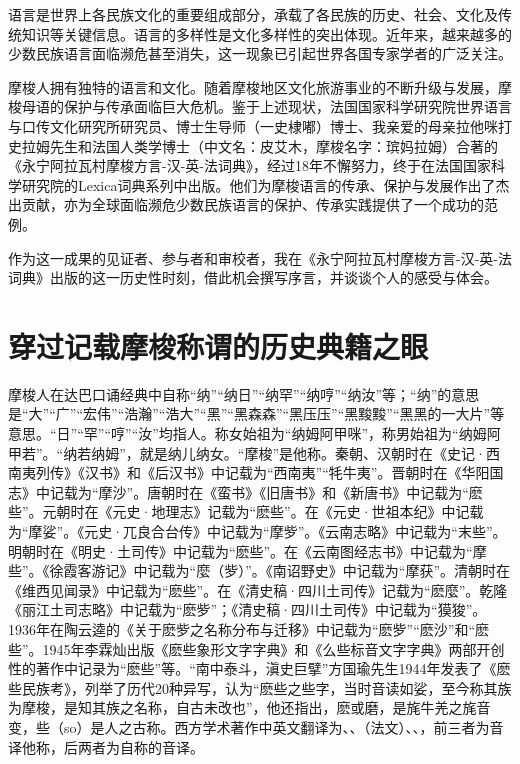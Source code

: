 语言是世界上各民族文化的重要组成部分，承载了各民族的历史、社会、文化及传统知识等关键信息。语言的多样性是文化多样性的突出体现。近年来，越来越多的少数民族语言面临濒危甚至消失，这一现象已引起世界各国专家学者的广泛关注。

摩梭人拥有独特的语言和文化。随着摩梭地区文化旅游事业的不断升级与发展，摩梭母语的保护与传承面临巨大危机。鉴于上述现状，法国国家科学研究院世界语言与口传文化研究所研究员、博士生导师（一史棣嘟）博士、我亲爱的母亲拉他咪打史拉姆先生和法国人类学博士（中文名：皮艾木，摩梭名字：瑸妈拉姆）合著的《永宁阿拉瓦村摩梭方言-汉-英-法词典》，经过18年不懈努力，终于在法国国家科学研究院的Lexica词典系列中出版。他们为摩梭语言的传承、保护与发展作出了杰出贡献，亦为全球面临濒危少数民族语言的保护、传承实践提供了一个成功的范例。

作为这一成果的见证者、参与者和审校者，我在《永宁阿拉瓦村摩梭方言-汉-英-法词典》出版的这一历史性时刻，借此机会撰写序言，并谈谈个人的感受与体会。

\section*{穿过记载摩梭称谓的历史典籍之眼}

摩梭人在达巴口诵经典中自称“纳”“纳日”“纳罕”“纳哼”“纳汝”等；“纳”的意思是“大”“广”“宏伟”“浩瀚”“浩大”“黑”“黑森森”“黑压压”“黑黢黢”“黑黑的一大片”等意思。“日”“罕”“哼”“汝”均指人。称女始祖为“纳姆阿甲咪”，称男始祖为“纳姆阿甲若”。“纳若纳姆”，就是纳儿纳女。“摩梭”是他称。秦朝、汉朝时在《史记·西南夷列传》《汉书》和《后汉书》中记载为“西南夷”“牦牛夷”。晋朝时在《华阳国志》中记载为“摩沙”。唐朝时在《蛮书》《旧唐书》和《新唐书》中记载为“麽些”。元朝时在《元史·地理志》记载为“麽些”。在《元史·世祖本纪》中记载为“摩娑”。《元史·兀良合台传》中记载为“摩㱔”。《云南志略》中记载为“末些”。明朝时在《明史·土司传》中记载为“麽些”。在《云南图经志书》中记载为“摩些”。《徐霞客游记》中记载为“麼（㱔）”。《南诏野史》中记载为“摩获”。清朝时在《维西见闻录》中记载为“麽些”。在《清史稿·四川土司传》记载为“麽麼”。乾隆《丽江土司志略》中记载为“麽㱔”；《清史稿·四川土司传》中记载为“獏狻”。1936年在陶云逵的《关于麽㱔之名称分布与迁移》中记载为“麽㱔”“麽沙”和“麽些”。1945年李霖灿出版《麽些象形文字字典》和《么些标音文字字典》两部开创性的著作中记录为“麽些”等。“南中泰斗，滇史巨擘”方国瑜先生1944年发表了《麽些民族考》，列举了历代20种异写，认为“麽些之些字，当时音读如娑，至今称其族为摩梭，是知其族之名称，自古未改也”，他还指出，麽或磨，是旄牛羌之旄音变，些（so）是人之古称。西方学术著作中英文翻译为、、（法文）、、，前三者为音译他称，后两者为自称的音译。

